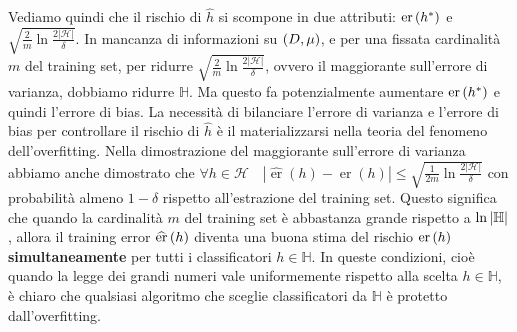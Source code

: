 \documentclass[\main/main.tex]{subfiles}
\begin{document}
\begin{observation}
\begin{multicols}{2}
        Vediamo quindi che il rischio di \(\hat{h}\) si scompone in due attributi: \(\text{er}\left(h^*\right)\) e \(\sqrt{\frac{2}{m} \ln \frac{2|\mathcal{H}|}{\delta}}\). In mancanza di informazioni su \(\left(D, \mu\right)\), e per una fissata cardinalità \(m\) del training set, per ridurre \(\sqrt{\frac{2}{m} \ln \frac{2|\mathcal{H}|}{\delta}}\), ovvero il maggiorante sull'errore di varianza, dobbiamo ridurre \(\mathbb{H}\). Ma questo fa potenzialmente aumentare \(\text{er}\left(h^*\right)\) e quindi l'errore di bias. La necessità di bilanciare l'errore di varianza e l'errore di bias per controllare il rischio di \(\hat{h}\) è il materializzarsi nella teoria del fenomeno dell'overfitting. Nella dimostrazione del maggiorante sull'errore di varianza abbiamo anche dimostrato che \(\forall h \in \mathcal{H} \quad|\widehat{\operatorname{er}}(h)-\operatorname{er}(h)| \leq \sqrt{\frac{1}{2 m} \ln \frac{2|\mathcal{H}|}{\delta}}\) con probabilità almeno \(1-\delta\) rispetto all'estrazione del training set. Questo significa che quando la cardinalità \(m\) del training set è abbastanza grande rispetto a \(\ln\left\lvert\mathbb{H}\right\rvert\), allora il training error \(\widehat{\text{er}}\left(h\right)\) diventa una buona stima del rischio \(\text{er}\left(h\right)\) \textbf{simultaneamente} per tutti i classificatori \(h\in\mathbb{H}\). In queste condizioni, cioè quando la legge dei grandi numeri vale uniformemente rispetto alla scelta \(h\in\mathbb{H}\), è chiaro che qualsiasi algoritmo che sceglie classificatori da \(\mathbb{H}\) è protetto dall'overfitting.
    \end{multicols}
\end{observation}
\end{document}

